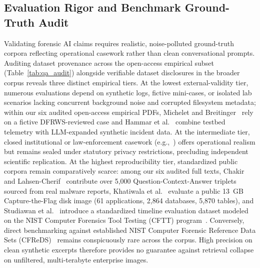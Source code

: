 \subsection{Evaluation Rigor and Benchmark Ground-Truth Audit}
Validating forensic AI claims requires realistic, noise-polluted ground-truth corpora reflecting operational casework rather than clean conversational prompts. Auditing dataset provenance across the open-access empirical subset (Table~\ref{tab:qa_audit}) alongside verifiable dataset disclosures in the broader corpus reveals three distinct empirical tiers. At the lowest external-validity tier, numerous evaluations depend on synthetic logs, fictive mini-cases, or isolated lab scenarios lacking concurrent background noise and corrupted filesystem metadata; within our six audited open-access empirical PDFs, Michelet and Breitinger~\cite{michelet2024_chatgpt} rely on a fictive DFRWS-reviewed case and Hammar et al.~\cite{hammar2026_incident} combine testbed telemetry with LLM-expanded synthetic incident data. At the intermediate tier, closed institutional or law-enforcement casework (e.g.,~\cite{kim2025_digital, ko2026_humansupervised}) offers operational realism but remains sealed under statutory privacy restrictions, precluding independent scientific replication. At the highest reproducibility tier, standardized public corpora remain comparatively scarce: among our six audited full texts, Chakir and Lahsen-Cherif~\cite{chakir2025_forensicsdata} contribute over 5,000 Question-Context-Answer triplets sourced from real malware reports, Khatiwala et al.~\cite{khatiwala2025_evaluating} evaluate a public 13~GB Capture-the-Flag disk image (61 applications, 2,864 databases, 5,870 tables), and Studiawan et al.~\cite{studiawan2025_towards} introduce a standardized timeline evaluation dataset modeled on the NIST Computer Forensics Tool Testing (CFTT) program~\cite{nist_cftt}. Conversely, direct benchmarking against established NIST Computer Forensic Reference Data Sets (CFReDS)~\cite{nist_cfreds} remains conspicuously rare across the corpus. High precision on clean synthetic excerpts therefore provides no guarantee against retrieval collapse on unfiltered, multi-terabyte enterprise images.
